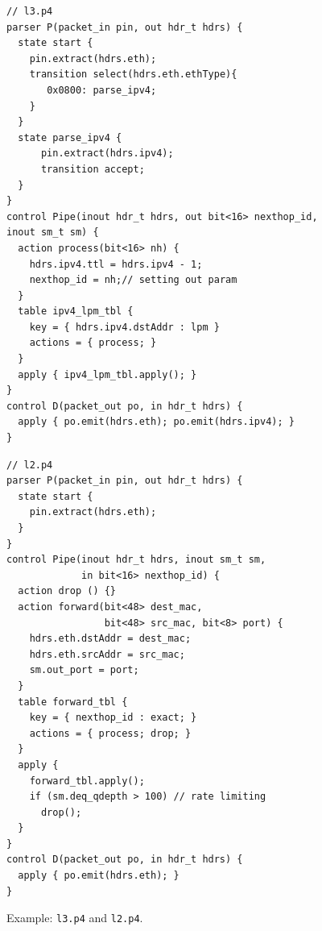 \documentclass{hotnets19}
\begin{document}
\begin{figure}[ht]
\noindent \begin{minipage}[t]{.48\textwidth}
\begin{lstlisting}[frame=none]
// l3.p4
parser P(packet_in pin, out hdr_t hdrs) {
  state start {
    pin.extract(hdrs.eth);
    transition select(hdrs.eth.ethType){
       0x0800: parse_ipv4;
    }
  }
  state parse_ipv4 {
      pin.extract(hdrs.ipv4);
      transition accept;
  }
}
control Pipe(inout hdr_t hdrs, out bit<16> nexthop_id, inout sm_t sm) {
  action process(bit<16> nh) {
    hdrs.ipv4.ttl = hdrs.ipv4 - 1;
    nexthop_id = nh;// setting out param
  }
  table ipv4_lpm_tbl {
    key = { hdrs.ipv4.dstAddr : lpm } 
    actions = { process; }
  }
  apply { ipv4_lpm_tbl.apply(); }
}
control D(packet_out po, in hdr_t hdrs) {
  apply { po.emit(hdrs.eth); po.emit(hdrs.ipv4); }
}
\end{lstlisting}
\end{minipage}\vline
\hfill\begin{minipage}[t]{.48\textwidth}
\begin{lstlisting}[frame=none]
// l2.p4
parser P(packet_in pin, out hdr_t hdrs) {
  state start {
    pin.extract(hdrs.eth);
  }
}
control Pipe(inout hdr_t hdrs, inout sm_t sm, 
             in bit<16> nexthop_id) {
  action drop () {}           
  action forward(bit<48> dest_mac, 
                 bit<48> src_mac, bit<8> port) {
    hdrs.eth.dstAddr = dest_mac;
    hdrs.eth.srcAddr = src_mac;
    sm.out_port = port;    
  }
  table forward_tbl {
    key = { nexthop_id : exact; } 
    actions = { process; drop; }
  }
  apply {
    forward_tbl.apply(); 
    if (sm.deq_qdepth > 100) // rate limiting
      drop();
  }
}
control D(packet_out po, in hdr_t hdrs) {
  apply { po.emit(hdrs.eth); }
}
\end{lstlisting}
\end{minipage}
\caption{Example: \texttt{l3.p4} and \texttt{l2.p4}.}
\label{fig:l3.p4.l2.p4}
\end{figure}


\end{document}
